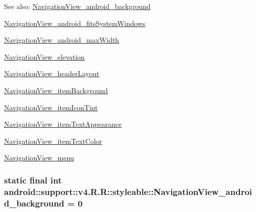 \begin{Desc}
\item[See also:]\hyperlink{classandroid_1_1support_1_1v4_1_1_r_1_1styleable_91a16f1c9df7acfb830e2783aa9b8a8d}{NavigationView\_\-android\_\-background} 

\hyperlink{classandroid_1_1support_1_1v4_1_1_r_1_1styleable_8fef1cdf6a087e5067022f2a52afaf85}{NavigationView\_\-android\_\-fitsSystemWindows} 

\hyperlink{classandroid_1_1support_1_1v4_1_1_r_1_1styleable_10571fdca8781dd2769893b7a2204a50}{NavigationView\_\-android\_\-maxWidth} 

\hyperlink{classandroid_1_1support_1_1v4_1_1_r_1_1styleable_bb75dddc513645cd42bbfa399042cef3}{NavigationView\_\-elevation} 

\hyperlink{classandroid_1_1support_1_1v4_1_1_r_1_1styleable_fe0580320d0eaac865d84f4737141ad0}{NavigationView\_\-headerLayout} 

\hyperlink{classandroid_1_1support_1_1v4_1_1_r_1_1styleable_eab074addccc9ceec10abf5ca55513c9}{NavigationView\_\-itemBackground} 

\hyperlink{classandroid_1_1support_1_1v4_1_1_r_1_1styleable_98d85bc9f9bd29fcdd3e78ac5d8ccafd}{NavigationView\_\-itemIconTint} 

\hyperlink{classandroid_1_1support_1_1v4_1_1_r_1_1styleable_b1a0c348b812e885f19add02ede8941e}{NavigationView\_\-itemTextAppearance} 

\hyperlink{classandroid_1_1support_1_1v4_1_1_r_1_1styleable_a57c40afd9bad59379ce3cb367835803}{NavigationView\_\-itemTextColor} 

\hyperlink{classandroid_1_1support_1_1v4_1_1_r_1_1styleable_6c7bd4b9c988fb62f1fabb28c57b981a}{NavigationView\_\-menu} \end{Desc}
\hypertarget{classandroid_1_1support_1_1v4_1_1_r_1_1styleable_91a16f1c9df7acfb830e2783aa9b8a8d}{
\subsubsection[{NavigationView\_\-android\_\-background}]{\setlength{\rightskip}{0pt plus 5cm}static final int android::support::v4.R.R::styleable::NavigationView\_\-android\_\-background = 0}}
\label{classandroid_1_1support_1_1v4_1_1_r_1_1styleable_91a16f1c9df7acfb830e2783aa9b8a8d}


